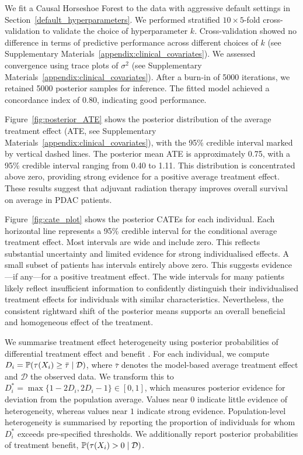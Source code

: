  

We fit a Causal Horseshoe Forest to the data with aggressive default settings in Section~\ref{default_hyperparameters}.
We performed stratified $10 \times 5$-fold cross-validation to validate the choice of hyperparameter $k$. 
Cross-validation showed no difference in terms of predictive performance across different choices of $k$ (see Supplementary Materials~\ref{appendix:clinical_covariates}).
We assessed convergence using trace plots of $\sigma^2$ (see Supplementary Materials~\ref{appendix:clinical_covariates}).
After a burn-in of 5000 iterations, we retained 5000 posterior samples for inference. 
The fitted model achieved a concordance index of 0.80, indicating good performance.

 


Figure~\ref{fig:posterior_ATE} shows the posterior distribution of the  average treatment effect (ATE, see Supplementary Materials~\ref{appendix:clinical_covariates}), with the 95\% credible interval marked by vertical dashed lines.
The posterior mean ATE is approximately 0.75, with a 95\% credible interval ranging from 0.40 to 1.11. 
This distribution is concentrated above zero, providing strong evidence for a positive average treatment effect.
These results suggest that adjuvant radiation therapy improves overall survival on average in PDAC patients.

Figure~\ref{fig:cate_plot} shows the posterior CATEs for each individual.
Each horizontal line represents a 95\% credible interval for the conditional average treatment effect.
Most intervals are wide and include zero.
This reflects substantial uncertainty and limited evidence for strong individualised effects.
A small subset of patients has intervals entirely above zero.
This suggests evidence---if any---for a positive treatment effect.
The wide intervals for many patients likely reflect insufficient information to confidently distinguish their individualised treatment effects for individuals with similar characteristics.
Nevertheless, the consistent rightward shift of the posterior means supports an overall beneficial and homogeneous effect of the treatment.



We summarise treatment effect heterogeneity using posterior probabilities of differential treatment effect and benefit \citep{henderson2020individualized}. 
For each individual, we compute 
$D_i = \mathbb{P}(\tau(X_i) \ge \bar\tau \mid \mathcal D)$, 
where $\bar\tau$ denotes the model-based average treatment effect and $\mathcal{D}$ the observed data. 
We transform this to 
$D_i^\ast = \max\{1 - 2D_i, 2D_i - 1\} \in [0,1]$, 
which measures posterior evidence for deviation from the population average. 
Values near $0$ indicate little evidence of heterogeneity, whereas values near $1$ indicate strong evidence. 
Population-level heterogeneity is summarised by reporting the proportion of individuals for whom $D_i^\ast$ exceeds pre-specified thresholds. 
We additionally report posterior probabilities of treatment benefit, 
$\mathbb{P}(\tau(X_i) > 0 \mid \mathcal D)$.

